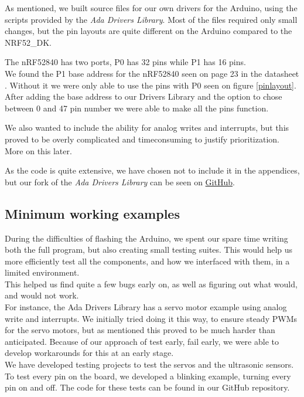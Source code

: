 \documentclass{article}
\begin{document}
As mentioned, we built source files for our own drivers for the Arduino, using the scripts provided by the \textit{Ada Drivers Library}. Most of the files required only small changes, but the pin layouts are quite different on the Arduino compared to the NRF52\_DK.

The nRF52840 has two ports, P0 has 32 pins while P1 has 16 pins.\\
We found the P1 base address for the nRF52840 seen on page 23 in the datasheet \cite{NRF52840}. Without it we were only able to use the pins with P0 seen on figure \ref{pinlayout}. After adding the base address to our Drivers Library and the option to chose between 0 and 47 pin number we were able to make all the pins function.

We also wanted to include the ability for analog writes and interrupts, but this proved to be overly complicated and timeconsuming to justify prioritization. More on this later.

As the code is quite extensive, we have chosen not to include it in the appendices, but our fork of the \textit{Ada Drivers Library} can be seen on \href{https://github.com/Stykk-Gruppen/Ada_Drivers_Library}{GitHub}.

\subsection{Minimum working examples}

During the difficulties of flashing the Arduino, we spent our spare time writing both the full program, but also creating small testing suites. This would help us more efficiently test all the components, and how we interfaced with them, in a limited environment.\\

This helped us find quite a few bugs early on, as well as figuring out what would, and would not work.\\

For instance, the Ada Drivers Library has a servo motor example using analog write and interrupts. We initially tried doing it this way, to ensure steady PWMs for the servo motors, but as mentioned this proved to be much harder than anticipated. Because of our approach of test early, fail early, we were able to develop workarounds for this at an early stage.\\

We have developed testing projects to test the servos and the ultrasonic sensors. To test every pin on the board, we developed a blinking example, turning every pin on and off. The code for these tests can be found in our GitHub repository.
\end{document}
